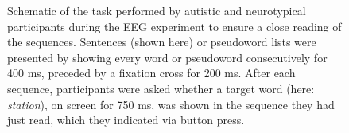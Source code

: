 \begin{figure}[!ht]
	\centering
	\caption{Schematic of the task performed by autistic and neurotypical participants during the EEG experiment to ensure a close reading of the sequences. Sentences (shown here) or pseudoword lists were presented by showing every word or pseudoword consecutively for 400 ms, preceded by a fixation cross for 200 ms. After each sequence, participants were asked whether a target word (here: \textit{station}), on screen for 750 ms, was shown in the sequence they had just read, which they indicated via button press.}
    \vspace*{-10pt}
	\label{fig:exp-design}
\end{figure}


